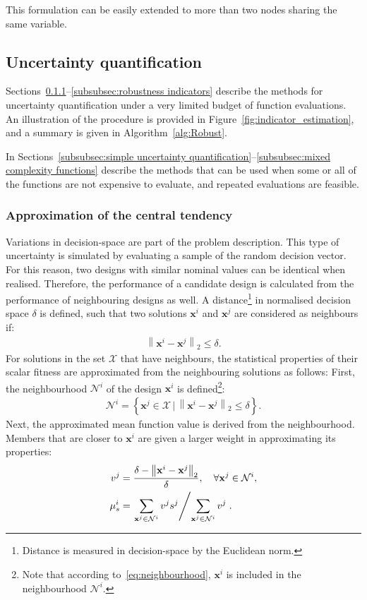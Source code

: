 \documentclass[a4paper]{article}
\newcommand{\brf}[1]{\left\lbrace{#1}\right\rbrace} %
\newcommand{\norm}[2]{\left\|{#1}\right\|_{#2}} %
\newcommand{\vx}{\ensuremath{\mathbf{x}}} %
\newcommand{\NSet}{\ensuremath{\mathcal{N}}} %
\newcommand{\XSet}{\ensuremath{\mathcal{X}}} %
\begin{document}
This formulation can be easily extended to more than two nodes sharing the same variable.

\subsection{Uncertainty quantification}
\label{subsec:Uncertainty quantification}
Sections~\ref{subsubsec:appx central}--\ref{subsubsec:robustness indicators} describe the methods for uncertainty quantification under a very limited budget of function evaluations. An illustration of the procedure is provided in Figure~\ref{fig:indicator_estimation}, and a summary is given in Algorithm~\ref{alg:Robust}.

In Sections~\ref{subsubsec:simple uncertainty quantification}--\ref{subsubsec:mixed complexity functions} describe the methods that can be used when some or all of the functions are not expensive to evaluate, and repeated evaluations are feasible.  

\subsubsection{Approximation of the central tendency}
\label{subsubsec:appx central}
Variations in decision-space are part of the problem description. This type of uncertainty is simulated by evaluating a sample of the random decision vector. For this reason, two designs with similar nominal values can be identical when realised. Therefore, the performance of a candidate design is calculated from the performance of neighbouring designs as well. A distance\footnote{Distance is measured in decision-space by the Euclidean norm.} in normalised decision space $\delta$ is defined, such that two solutions $\vx^i$ and $\vx^j$ are considered as neighbours if:
\begin{align}
	\norm{\vx^i-\vx^j}{2}\leq\delta.
\end{align}
For solutions in the set $\XSet$ that have neighbours, the statistical properties of their scalar fitness are approximated from the neighbouring solutions as follows:
First, the neighbourhood $\NSet^i$ of the design $\vx^i$ is defined\footnote{Note that according to~\eqref{eq:neighbourhood}, $\vx^i$ is included in the neighbourhood $\NSet^i$.}:
\begin{align}
	\label{eq:neighbourhood}
	\NSet^i=\brf{\vx^j\in \XSet \,\vert \,\norm{\vx^i-\vx^j}{2}\leq\delta}.
\end{align}
Next, the approximated mean function value is derived from the neighbourhood. Members that are closer to $\vx^i$ are given a larger weight in approximating its properties:
\begin{align}
	v^j &= \frac{\delta-\norm{\vx^i-\vx^j}{2}}{\delta}, \quad  \forall \vx^j\in\NSet^i,\\
\label{eq:neighbourhood mean}	\mu^i_s &= \left. \sum_{\vx^j\in\NSet^i} v^j s^j \middle/ \sum_{\vx^j\in\NSet^i} v^j \right. .
\end{align}
\end{document}
